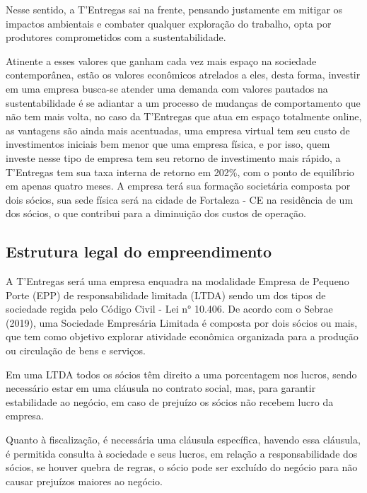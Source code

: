 Nesse sentido, a T'Entregas sai na frente, pensando justamente em mitigar os impactos ambientais e combater qualquer exploração do trabalho, opta por produtores comprometidos com a sustentabilidade. \par

Atinente a esses valores que ganham cada vez mais espaço na sociedade contemporânea, estão os valores econômicos atrelados a eles, desta forma, investir em uma empresa busca-se atender uma demanda com valores pautados na sustentabilidade é se adiantar a um processo de mudanças de comportamento que não tem mais volta, no caso da T'Entregas que atua em espaço totalmente online, as vantagens são ainda mais acentuadas, uma empresa virtual tem seu custo de investimentos iniciais bem menor que uma empresa física, e por isso, quem investe nesse tipo de empresa tem seu retorno de investimento mais rápido, a T'Entregas tem sua taxa interna de retorno em 202\%, com o ponto de equilíbrio em apenas quatro meses. A empresa terá sua formação societária composta por dois sócios, sua sede física será na cidade de Fortaleza - CE na residência de um dos sócios, o que contribui para a diminuição dos custos de operação. \par

\subsection{Estrutura legal do empreendimento}

A T'Entregas será uma empresa enquadra na modalidade Empresa 
de Pequeno Porte (EPP) de responsabilidade limitada (LTDA) sendo um dos tipos 
de sociedade regida pelo Código Civil - Lei n° 10.406. De acordo com o Sebrae 
(2019), uma Sociedade Empresária Limitada é composta por dois sócios ou mais, 
que tem como objetivo explorar atividade econômica organizada para a produção 
ou circulação de bens e serviços. \par

Em uma LTDA todos os sócios têm direito a uma porcentagem nos lucros, sendo necessário estar em uma cláusula no contrato social, mas, para garantir estabilidade ao negócio, em caso de prejuízo os sócios não recebem lucro da empresa. \par

Quanto à fiscalização, é necessária uma cláusula específica, havendo essa cláusula, é permitida consulta à sociedade e seus lucros, em relação a responsabilidade dos sócios, se houver quebra de regras, o sócio pode ser excluído do negócio para não causar prejuízos maiores ao negócio. \par

